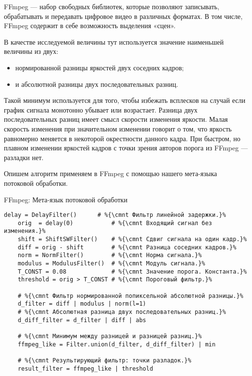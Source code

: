 \begin{noteframe}
    FFmpeg — набор свободных библиотек, которые позволяют записывать, обрабатывать и передавать цифровое видео в различных форматах. 
    В том числе, FFmpeg содержит в себе возможность 
    выделения «сцен».
    
    В качестве исследуемой величины тут используется 
    значение наименьшей величины из двух:
    \begin{itemize}
        \item нормированной разницы яркостей двух соседних кадров;
        \item и абсолютной разницы двух последовательных разниц.
    \end{itemize}
    Такой минимум используется для того, чтобы избежать всплесков
    на случай если график сигнала монотонно убывает или возрастает.
    Разница двух последовательных разниц имеет смысл скорости 
    изменения яркости. Малая скорость изменения 
    при значительном изменении говорит о том, 
    что яркость равномерно меняется 
    в некоторой окрестности данного кадра.
    При быстром, но плавном изменении яркостей кадров 
    с точки зрения авторов порога из FFmpeg — разладки нет.
    
    Опишем алгоритм применяем в FFmpeg 
    с помощью нашего мета-языка потоковой обработки.
\end{noteframe}




\begin{frame}[fragile]{FFmpeg: Мета-язык потоковой обработки}
    \begin{lstlisting}[language=FilterPython]
    delay = DelayFilter()      # %{\cmnt Фильтр линейной задержки.}%
    orig  = delay(0)           # %{\cmnt Входящий сигнал без изменения.}%
    shift = ShiftSWFilter()    # %{\cmnt Сдвиг сигнала на один кадр.}%
    diff = orig - shift        # %{\cmnt Разница соседних кадров.}%
    norm = NormFilter()        # %{\cmnt Норма сигнала.}%
    modulus = ModulusFilter()  # %{\cmnt Модуль сигнала.}%
    T_CONST = 0.08             # %{\cmnt Значение порога. Константа.}%
    threshold = orig > T_CONST # %{\cmnt Пороговый фильтр.}%
    
    # %{\cmnt Фильтр нормированной попиксельной абсолютной разницы.}%
    d_filter = diff | modulus | norm(l=1)
    # %{\cmnt Абсолютная разница двух последовательных разниц.}%
    d_diff_filter = d_filter | diff | abs
    
    # %{\cmnt Минимум между разницей и разницей разниц.}%
    ffmpeg_like = Filter.union(d_filter, d_diff_filter) | min
    
    # %{\cmnt Результирующий фильтр: точки разладок.}%
    result_filter = ffmpeg_like | threshold
    \end{lstlisting}
\end{frame}

